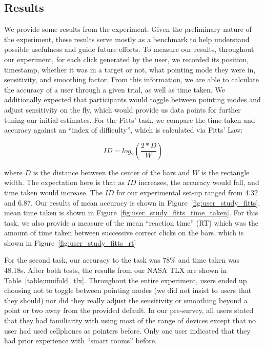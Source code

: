 \subsection{Results}

We provide some results from the experiment. Given the preliminary nature
of the experiment, these results serve mostly as a benchmark to help
understand possible usefulness and guide future efforts. To measure our results,
throughout our experiment, for each click generated by the user, we recorded
its position, timestamp, whether it was in a target or not, what pointing
mode they were in, sensitivity, and smoothing factor. From this information, we
are able to calculate the accuracy of a user through a given trial, as well
as time taken. We additionally expected that participants would toggle between
pointing modes and adjust sensitivity on the fly, which would provide us
data points for further tuning our initial estimates. For the Fitts' task,
we compare the time taken and accuracy against an ``index of
difficulty'', which is calculated via Fitts' Law:

\begin{equation}
    ID = log_{2}(\frac{2 * D}{W})
\end{equation}

where $D$ is the distance between the center of the bars and $W$ is the rectangle
width. The expectation here is that as $ID$ increases, the accuracy would fall,
and time taken would increase. The $ID$ for our experimental set-up ranged from
4.32 and 6.87. Our results of mean accuracy is shown in
Figure~\ref{fig:user_study_fitts}, mean time taken is shown in
Figure~\ref{fig:user_study_fitts_time_taken}. For this task, we also provide
a measure of the mean ``reaction time'' (RT) which was the amount of time
taken between successive correct clicks on the bars, which is shown in
Figure~\ref{fig:user_study_fitts_rt}

For the second task, our accuracy  to the task was 78\% and time taken was 
48.18s. After both tests, the results from our NASA TLX  are shown in
Table~\ref{table:muifold_tlx}. Throughout the entire experiment, users
ended up choosing not to toggle between pointing modes (we did not insist
to users that they should) nor did they really adjust the sensitivity or
smoothing beyond a point or two away from the provided default. In our
pre-survey, all users stated that they had familiarity with using most of the
range of devices except that no user had used cellphones as pointers before.
Only one user indicated that they had prior experience with ``smart rooms''
before.


